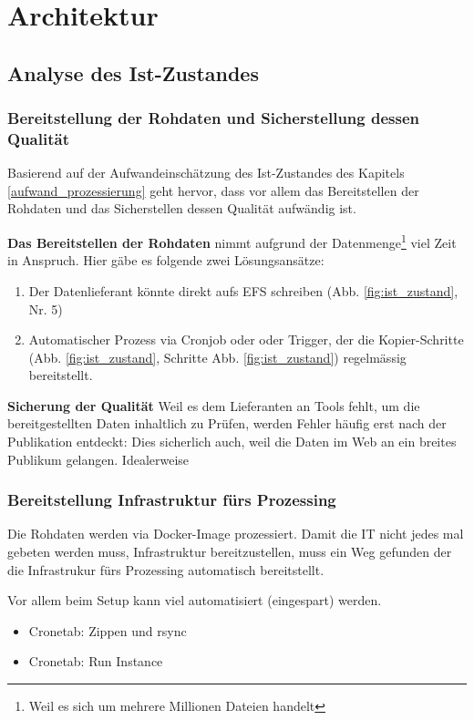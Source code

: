 \section{Architektur}

\subsection{Analyse des Ist-Zustandes}
\subsubsection{Bereitstellung der Rohdaten und Sicherstellung dessen Qualität}
Basierend auf der Aufwandeinschätzung des Ist-Zustandes des Kapitels \ref{aufwand_prozessierung} geht hervor, dass vor allem das Bereitstellen der Rohdaten und das Sicherstellen dessen Qualität aufwändig ist. 

\textbf{Das Bereitstellen der Rohdaten} nimmt aufgrund der Datenmenge\footnote{Weil es sich um mehrere Millionen Dateien handelt} viel Zeit in Anspruch. Hier gäbe es folgende zwei Lösungsansätze:
\begin{enumerate}
\item Der Datenlieferant könnte direkt aufs EFS schreiben (Abb. \ref{fig:ist_zustand}, Nr. 5)
\item Automatischer Prozess via Cronjob oder oder Trigger, der die Kopier-Schritte (Abb. \ref{fig:ist_zustand}, Schritte Abb. \ref{fig:ist_zustand}) regelmässig bereitstellt.
\end{enumerate}

\textbf{Sicherung der Qualität}
Weil es dem Lieferanten an Tools fehlt, um die bereitgestellten Daten inhaltlich zu Prüfen, werden Fehler 
häufig erst nach der Publikation entdeckt: Dies sicherlich auch, weil die Daten im Web an ein breites Publikum gelangen. Idealerweise

\subsubsection{Bereitstellung Infrastruktur fürs Prozessing}
Die Rohdaten werden via Docker-Image prozessiert. Damit die IT nicht jedes mal gebeten werden muss, Infrastruktur bereitzustellen, muss ein Weg gefunden der die Infrastrukur fürs Prozessing automatisch bereitstellt. 



Vor allem beim Setup kann viel automatisiert (eingespart) werden. 
\begin{itemize}
\item Cronetab: Zippen und rsync
\item Cronetab: Run Instance
\end{itemize}

